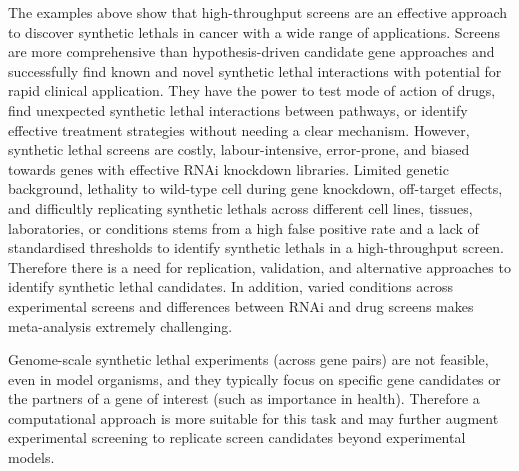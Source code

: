 
The examples above show that high-throughput screens are an effective approach to discover \glspl{synthetic lethal} in cancer with a wide range of applications. Screens are more comprehensive than hypothesis-driven candidate gene approaches and successfully find known and novel \gls{synthetic lethal} interactions with potential for rapid clinical application. They have the power to test mode of action of drugs, find unexpected \gls{synthetic lethal} interactions between \glspl{pathway}, or identify effective treatment strategies without needing a clear mechanism. However, \gls{synthetic lethal} screens are costly, labour-intensive, error-prone, and biased towards genes with effective \gls{RNAi} knockdown libraries. Limited genetic background, lethality to \gls{wild-type} cell during gene knockdown, off-target effects, and difficultly replicating \glspl{synthetic lethal} across different cell lines, tissues, laboratories, or conditions stems from a high false positive rate and a lack of standardised thresholds to identify \glspl{synthetic lethal} in a high-throughput screen. Therefore there is a need for replication, validation, and alternative approaches to identify \gls{synthetic lethal} candidates. In addition, varied conditions across experimental screens and differences between \gls{RNAi} and drug screens makes meta-analysis extremely challenging.

Genome-scale \gls{synthetic lethal} experiments (across gene pairs) are not feasible, even in model organisms, and they typically focus on specific gene candidates or the partners of a gene of interest (such as importance in health). Therefore a computational approach is more suitable for this task and may further augment experimental screening to replicate screen candidates beyond experimental models.  

